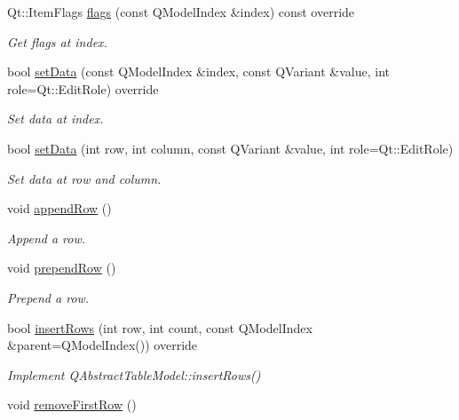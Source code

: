 \begin{DoxyCompactItemize}
Qt\+::\+Item\+Flags \hyperlink{class_mdt_1_1_item_model_1_1_variant_table_model_a077612298e4d3e522d3ea10f4284c3b5}{flags} (const Q\+Model\+Index \&index) const override
\begin{DoxyCompactList}\small\item\em Get flags at index. \end{DoxyCompactList}\item 
bool \hyperlink{class_mdt_1_1_item_model_1_1_variant_table_model_a5a752c74aa50dd06043f753da6b74905}{set\+Data} (const Q\+Model\+Index \&index, const Q\+Variant \&value, int role=Qt\+::\+Edit\+Role) override
\begin{DoxyCompactList}\small\item\em Set data at index. \end{DoxyCompactList}\item 
bool \hyperlink{class_mdt_1_1_item_model_1_1_variant_table_model_af8eec79a03c244c02c988d640605f521}{set\+Data} (int row, int column, const Q\+Variant \&value, int role=Qt\+::\+Edit\+Role)
\begin{DoxyCompactList}\small\item\em Set data at row and column. \end{DoxyCompactList}\item 
void \hyperlink{class_mdt_1_1_item_model_1_1_variant_table_model_a70feaea87d484ab2fa220a408f043a3a}{append\+Row} ()\hypertarget{class_mdt_1_1_item_model_1_1_variant_table_model_a70feaea87d484ab2fa220a408f043a3a}{}\label{class_mdt_1_1_item_model_1_1_variant_table_model_a70feaea87d484ab2fa220a408f043a3a}

\begin{DoxyCompactList}\small\item\em Append a row. \end{DoxyCompactList}\item 
void \hyperlink{class_mdt_1_1_item_model_1_1_variant_table_model_ab3e2fb4840ebccaa1fca900bbab9befe}{prepend\+Row} ()\hypertarget{class_mdt_1_1_item_model_1_1_variant_table_model_ab3e2fb4840ebccaa1fca900bbab9befe}{}\label{class_mdt_1_1_item_model_1_1_variant_table_model_ab3e2fb4840ebccaa1fca900bbab9befe}

\begin{DoxyCompactList}\small\item\em Prepend a row. \end{DoxyCompactList}\item 
bool \hyperlink{class_mdt_1_1_item_model_1_1_variant_table_model_a91bc169e793e08a91cefae7e6cac1a7c}{insert\+Rows} (int row, int count, const Q\+Model\+Index \&parent=Q\+Model\+Index()) override
\begin{DoxyCompactList}\small\item\em Implement Q\+Abstract\+Table\+Model\+::insert\+Rows() \end{DoxyCompactList}\item 
void \hyperlink{class_mdt_1_1_item_model_1_1_variant_table_model_a0c89f7be9a176fdbe38f842efc3fc86d}{remove\+First\+Row} ()\hypertarget{class_mdt_1_1_item_model_1_1_variant_table_model_a0c89f7be9a176fdbe38f842efc3fc86d}{}\label{class_mdt_1_1_item_model_1_1_variant_table_model_a0c89f7be9a176fdbe38f842efc3fc86d}


\end{DoxyCompactItemize}
